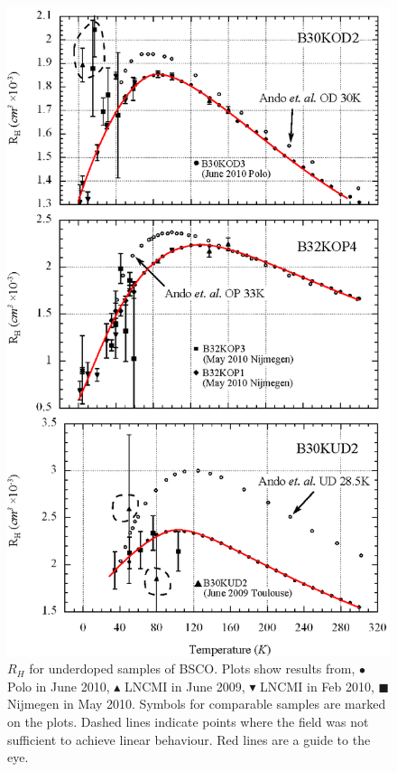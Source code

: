 \begin{figure}[htbp]
	\begin{center}
		\includegraphics[scale=0.9]{Chapter-HallBSCO/Figures/HallIndividual/HallIndividualOP}
		\caption{$R_H$ for underdoped samples of \ac{BSCO}. Plots show results from, $\bullet$ Polo in June 2010, $\blacktriangle$ \ac{LNCMI} in June 2009, $\blacktriangledown$ \ac{LNCMI} in Feb 2010, $\blacksquare$ Nijmegen in May 2010. Symbols for comparable samples are marked on the plots. Dashed lines indicate points where the field was not sufficient to achieve linear behaviour. Red lines are a guide to the eye.}
		\label{Fig:ExpH:HallIndividualOP}
	\end{center}
\end{figure}

